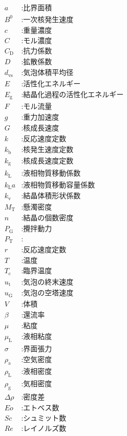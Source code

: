\documentclass[a4j, titlepage]{jsarticle}
\begin{document}
\begin{align*}
  a &: \text{比界面積} \\
  B^0 &: \text{一次核発生速度} \\
  c &: \text{重量濃度} \\
  C &: \text{モル濃度} \\
  C_\mathrm{D} &: \text{抗力係数} \\
  D &: \text{拡散係数} \\
  d_\mathrm{vs} &: \text{気泡体積平均径} \\
  E &: \text{活性化エネルギー} \\
  E_\mathrm{g} &: \text{結晶化過程の活性化エネルギー} \\
  F &: \text{モル流量} \\
  g &: \text{重力加速度} \\
  G &: \text{核成長速度} \\
  k &: \text{反応速度定数} \\
  k_\mathrm{b} &: \text{核発生速度定数} \\
  k_\mathrm{g} &: \text{核成長速度定数} \\
  k_\mathrm{L} &: \text{液相物質移動係数} \\
  k_\mathrm{L} a &: \text{液相物質移動容量係数} \\
  k_\mathrm{v} &: \text{結晶体積形状係数} \\
  M_\mathrm{T} &: \text{懸濁密度} \\
  n &: \text{結晶の個数密度} \\
  P_\mathrm{G} &: \text{攪拌動力} \\
  P_\mathrm{T} &: \text{} \\
  r &: \text{反応速度定数} \\
  T &: \text{温度} \\
  T_\mathrm{c} &: \text{臨界温度} \\
  u_\mathrm{t} &: \text{気泡の終末速度} \\
  u_\mathrm{G} &: \text{気泡の空塔速度} \\
  V &: \text{体積} \\
  \beta &: \text{還流率} \\
  \mu &: \text{粘度} \\
  \mu_\mathrm{L} &: \text{液相粘度} \\
  \sigma &: \text{界面張力} \\
  \rho_\mathrm{a} &: \text{空気密度} \\
  \rho_\mathrm{L} &: \text{液相密度} \\
  \rho_\mathrm{g} &: \text{気相密度} \\
  \varDelta\rho &: \text{密度差} \\
  Eo &: \text{エトベス数} \\
  Sc &: \text{シュミット数} \\
  Re &: \text{レイノルズ数}
\end{align*}
\end{document}
